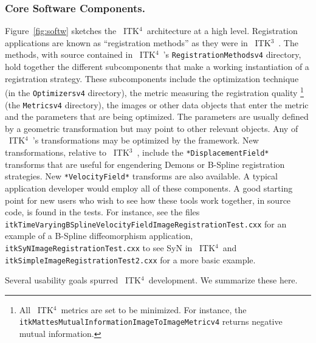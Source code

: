 \documentclass{frontiersSCNS}
\newcommand{\tk}{~ITK$^{\text{4}}$~}
\newcommand{\tkt}{~ITK$^{\text{3}}$~}
\begin{document}
\subsubsection{Core Software Components.} Figure~\ref{fig:softw} sketches the \tk architecture at a high level.
Registration applications are known as ``registration methods'' as
they were in \tkt.  The methods, with source contained in \tk's \texttt{RegistrationMethodsv4}
directory, hold together the different
subcomponents that make a working instantiation of a registration
strategy.  These subcomponents include the optimization technique (in
the \texttt{Optimizersv4} directory), the
metric measuring the registration quality \footnote{All \tk metrics
  are set to be minimized.  For instance, the
  \texttt{itkMattesMutualInformationImageToImageMetricv4} returns negative mutual information.} (the \texttt{Metricsv4} directory), the images or other data
objects that enter the metric and the parameters that are being
optimized.  The parameters are usually defined by a geometric
transformation but may point to other relevant objects.  Any of \tk's
transformations may be optimized by the framework.  New
transformations, relative to \tkt, include the
\texttt{*DisplacementField*} transforms that are useful for
engendering Demons or B-Spline registration strategies.  New
\texttt{*VelocityField*} transforms are also available.  A typical
application developer would employ all of these components.  A good
starting point for new users who wish to see how these tools work
together, in source code, is found in the tests.  For instance, see the
files
\texttt{itkTimeVaryingBSplineVelocityFieldImageRegistrationTest.cxx}
for an example of a B-Spline diffeomorphism application,
\texttt{itkSyNImageRegistrationTest.cxx} to see SyN in \tk and
\texttt{itkSimpleImageRegistrationTest2.cxx} for a more basic example.


Several usability goals spurred \tk development.  We summarize these here.
\end{document}
